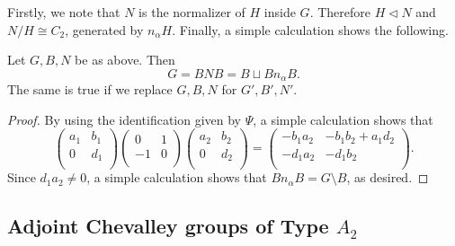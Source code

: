 Firstly, we note that $N$ is the normalizer of $H$ inside $G$. Therefore $H\triangleleft N$ and $N/H\cong C_2$, generated by $n_\alpha H$. Finally, a simple calculation shows the following.

\begin{theorem}
    Let $G,B,N$ be as above. Then 
    $$G=BNB=B\sqcup Bn_\alpha B.$$
    The same is true if we replace $G,B,N$ for $G',B',N'$.
\end{theorem}
\begin{proof}
    By using the identification given by $\Psi$, a simple calculation shows that 
    $$\begin{pmatrix}
        a_1 & b_1\\
        0 & d_1\\
    \end{pmatrix}\begin{pmatrix}
        0 & 1\\
        -1 & 0\\
    \end{pmatrix}\begin{pmatrix}
        a_2 & b_2\\
        0 & d_2\\
    \end{pmatrix}=\begin{pmatrix}
        -b_1a_2 & -b_1b_2+a_1d_2\\
        -d_1a_2 & -d_1b_2\\
    \end{pmatrix}.$$
    Since $d_1a_2\neq 0$, a simple calculation shows that $Bn_\alpha B=G\setminus B$, as desired.
\end{proof}





\subsection{Adjoint Chevalley groups of Type $A_2$}

